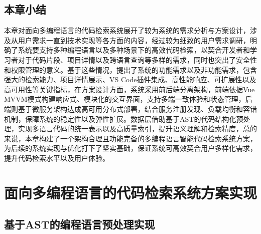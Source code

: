 \documentclass[UTF8,a4paper,12pt]{ctexart}
\numberwithin{equation}{section}
\begin{document}
\subsection{本章小结}
本章对面向多编程语言的代码检索系统展开了较为系统的需求分析与方案设计，涉及从用户需求一直到技术实现等各方面的内容，经过较为细致的用户需求调研，明确了系统要支持多种编程语言以及多种场景下的高效代码检索，以契合开发者和学习者对于代码片段、项目详情以及跨语言查询等多样的需求，同时也突出了安全性和权限管理的意义。基于这些情况，提出了系统的功能需求以及非功能需求，包含强大的检索能力、项目详情展示、VS Code插件集成、高性能响应、可扩展性以及高可用性等关键指标，在方案设计方面，系统采用前后端分离架构，前端依据Vue MVVM模式构建响应式、模块化的交互界面，支持多端一致体验和状态管理，后端则基于微服务架构达成高可用分布式部署，结合服务注册发现、负载均衡和容错机制，保障系统的稳定性以及弹性扩展。数据层借助基于AST的代码结构化预处理，实现多语言代码的统一表示以及高质量索引，提升语义理解和检索精度，总的来说，本章构建了一个架构合理且功能完备的多编程语言智能代码检索系统方案，为后续的系统实现与优化打下了坚实基础，保证系统可高效契合用户多样化需求，提升代码检索水平以及用户体验。\par


\section{面向多编程语言的代码检索系统方案实现}
\subsection{基于AST的编程语言预处理实现}
\end{document}
